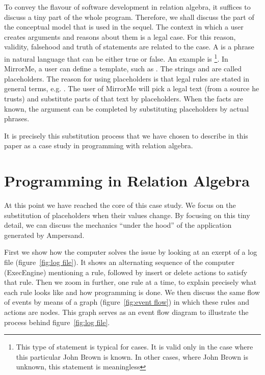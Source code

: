 \documentclass{svproc}
\begin{document}
	To convey the flavour of software development in relation algebra, it suffices to discuss a tiny part of the whole program.
	Therefore, we shall discuss the part of the conceptual model that is used in the sequel.
	The context in which a user creates arguments and reasons about them is a legal case.
	For this reason, validity, falsehood and truth of statements are related to the case.
	A  is a phrase in natural language that can be either true or false.
	An example is %
\footnote{This type of statement is typical for cases. It is valid only in the case where this particular John Brown is known.
	In other cases, where John Brown is unknown, this statement is meaningless}.
	In MirrorMe, a user can define a template, such as .
	The strings \stmtText{[emp]} and \stmtText{[increase]} are called placeholders.
	The reason for using placeholders is that legal rules are stated in general terms, e.g.
	.
	The user of MirrorMe will pick a legal text (from a source he trusts) and substitute parts of that text by placeholders.
	When the facts are known, the argument can be completed by substituting placeholders by actual phrases.

	It is precisely this substitution process that we have chosen to describe in this paper as a case study in
	programming with relation algebra.

\section{Programming in Relation Algebra}
\label{sct:Programming in RA}
	At this point we have reached the core of this case study.
	We focus on the substitution of placeholders when their values change.
	By focusing on this tiny detail, we can discuss the mechanics ``under the hood'' of the application generated by Ampersand.

	First we show how the computer solves the issue by looking at an exerpt of a log file (figure~\ref{fig:log file}).
	It shows an alternating sequence of the computer (ExecEngine) mentioning a rule,
	followed by insert or delete actions to satisfy that rule.
	Then we zoom in further, one rule at a time, to explain precisely what each rule looks like and how programming is done.
	We then discuss the same flow of events by means of a graph (figure~\ref{fig:event flow}) in which these rules and actions are nodes.
	This graph serves as an event flow diagram to illustrate the process behind figure~\ref{fig:log file}.
\end{document}
